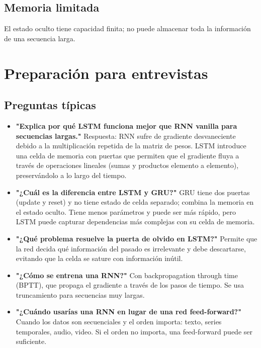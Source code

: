 \documentclass[12pt,a4paper,openany,oneside]{book}
\begin{document}
\subsection{Memoria limitada}
El estado oculto tiene capacidad finita; no puede almacenar toda la información de una secuencia larga.

\section{Preparación para entrevistas}

\subsection{Preguntas típicas}
\begin{itemize}
    \item \textbf{"Explica por qué LSTM funciona mejor que RNN vanilla para secuencias largas."}
    Respuesta: RNN sufre de gradiente desvaneciente debido a la multiplicación repetida de la matriz de pesos. LSTM introduce una celda de memoria con puertas que permiten que el gradiente fluya a través de operaciones lineales (sumas y productos elemento a elemento), preservándolo a lo largo del tiempo.
    
    \item \textbf{"¿Cuál es la diferencia entre LSTM y GRU?"}
    GRU tiene dos puertas (update y reset) y no tiene estado de celda separado; combina la memoria en el estado oculto. Tiene menos parámetros y puede ser más rápido, pero LSTM puede capturar dependencias más complejas con su celda de memoria.
    
    \item \textbf{"¿Qué problema resuelve la puerta de olvido en LSTM?"}
    Permite que la red decida qué información del pasado es irrelevante y debe descartarse, evitando que la celda se sature con información inútil.
    
    \item \textbf{"¿Cómo se entrena una RNN?"}
    Con backpropagation through time (BPTT), que propaga el gradiente a través de los pasos de tiempo. Se usa truncamiento para secuencias muy largas.
    
    \item \textbf{"¿Cuándo usarías una RNN en lugar de una red feed-forward?"}
    Cuando los datos son secuenciales y el orden importa: texto, series temporales, audio, video. Si el orden no importa, una feed-forward puede ser suficiente.
\end{itemize}
\end{document}
